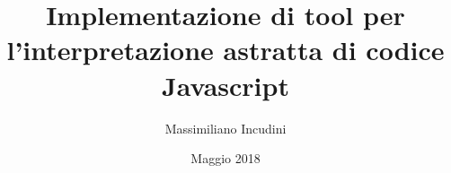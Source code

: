 \documentclass[openany,oneside]{book}
\title{Implementazione di tool per l'interpretazione astratta di codice Javascript }
\author{Massimiliano Incudini}
\date{Maggio 2018}
\theoremstyle{definition}
\begin{document}
\maketitle

\setcounter{tocdepth}{1}
\tableofcontents





\begin{appendices}

\end{appendices}

\printbibliography
\end{document}
